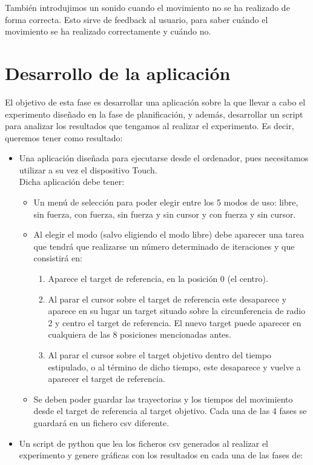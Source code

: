 \documentclass[a4paper,11pt, oneside]{book}
\begin{document}
También introdujimos un sonido cuando el movimiento no se ha realizado de forma correcta. Esto sirve de feedback al usuario, para saber cuándo el movimiento se ha realizado correctamente y cuándo no. 


\section{Desarrollo de la aplicación}

El objetivo de esta fase es desarrollar una aplicación sobre la que llevar a cabo el experimento diseñado en la fase de planificación, y además, desarrollar un script para analizar los resultados que tengamos al realizar el experimento. Es decir, queremos tener como resultado:
\begin{itemize}
	\item Una aplicación diseñada para ejecutarse desde el ordenador, pues necesitamos utilizar a su vez el dispositivo Touch. \\
	Dicha aplicación debe tener:
	\begin{itemize}
		\item Un menú de selección para poder elegir entre los 5 modos de uso: libre, sin fuerza, con fuerza, sin fuerza y sin cursor y con fuerza y sin cursor.
		\item Al elegir el modo (salvo eligiendo el modo libre) debe aparecer una tarea que tendrá que realizarse un número determinado de iteraciones y que consistirá en:
		\begin{enumerate}
			\item Aparece el target de referencia, en la posición 0 (el centro).
			\item Al parar el cursor sobre el target de referencia este desaparece y aparece en su lugar un target situado sobre la circunferencia de radio 2 y centro el target de referencia. El nuevo target puede aparecer en cualquiera de las 8 posiciones mencionadas antes.
			\item Al parar el cursor sobre el target objetivo dentro del tiempo estipulado, o al término de dicho tiempo, este desaparece y vuelve a aparecer el target de referencia.
		\end{enumerate}
		\item Se deben poder guardar las trayectorias y los tiempos del movimiento desde el target de referencia al target objetivo. Cada una de las 4 fases se guardará en un fichero csv diferente.
	\end{itemize}
	\item Un script de python que lea los ficheros csv generados al realizar el experimento y genere gráficas con los resultados en cada una de las fases de:

\end{itemize}
\end{document}
